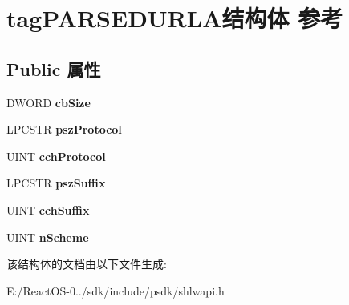 \hypertarget{structtag_p_a_r_s_e_d_u_r_l_a}{}\section{tag\+P\+A\+R\+S\+E\+D\+U\+R\+L\+A结构体 参考}
\label{structtag_p_a_r_s_e_d_u_r_l_a}
\subsection*{Public 属性}
\begin{DoxyCompactItemize}
\item 
\mbox{\label{structtag_p_a_r_s_e_d_u_r_l_a_ad7be04389fc472ca161adf3bdfbd25ba}} 
D\+W\+O\+RD {\bfseries cb\+Size}
\item 
\mbox{\label{structtag_p_a_r_s_e_d_u_r_l_a_af0587cf1401ba897a9beb52f078671b3}} 
L\+P\+C\+S\+TR {\bfseries psz\+Protocol}
\item 
\mbox{\label{structtag_p_a_r_s_e_d_u_r_l_a_ac98249c9d2d9022aced37496b20c8a05}} 
U\+I\+NT {\bfseries cch\+Protocol}
\item 
\mbox{\label{structtag_p_a_r_s_e_d_u_r_l_a_aa6be0839b6f1e912357bd7e1a5ec9796}} 
L\+P\+C\+S\+TR {\bfseries psz\+Suffix}
\item 
\mbox{\label{structtag_p_a_r_s_e_d_u_r_l_a_a83e0c9e719a2a076298f103ae4da6e4d}} 
U\+I\+NT {\bfseries cch\+Suffix}
\item 
\mbox{\label{structtag_p_a_r_s_e_d_u_r_l_a_a6ca4e9e54cd115aea31a2dae54c8b52a}} 
U\+I\+NT {\bfseries n\+Scheme}
\end{DoxyCompactItemize}


该结构体的文档由以下文件生成\+:\begin{DoxyCompactItemize}
\item 
E\+:/\+React\+O\+S-\/0../sdk/include/psdk/shlwapi.\+h\end{DoxyCompactItemize}
